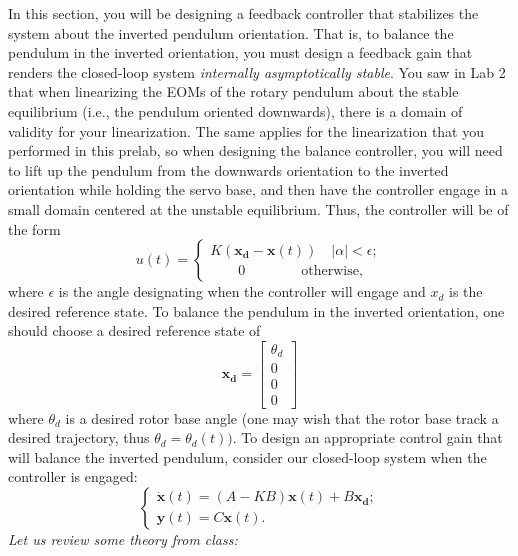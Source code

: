 \documentclass[12pt]{report}
\begin{document}
In this section, you will be designing a feedback controller that stabilizes the system about the inverted pendulum orientation. That is, to balance the pendulum in the inverted orientation, you must design a feedback gain that renders the closed-loop system \emph{internally asymptotically stable}. You saw in Lab 2 that when linearizing the EOMs of the rotary pendulum about the stable equilibrium (i.e., the pendulum oriented downwards), there is a domain of validity for your linearization. The same applies for the linearization that you performed in this prelab, so when designing the balance controller, you will need to lift up the pendulum from the downwards orientation to the inverted orientation while holding the servo base, and then have the controller engage in a small domain centered at the unstable equilibrium. Thus, the controller will be of the form
\[ u(t) =
    \begin{cases}
        K(\mathbf{x_d} - \mathbf{x}(t)) \quad |\alpha| < \epsilon; \\
        \quad \quad 0 \quad \quad \quad \quad \text{otherwise},
    \end{cases}
\]
where $\epsilon$ is the angle designating when the controller will engage and $x_d$ is the desired reference state. To balance the pendulum in the inverted orientation, one should choose a desired reference state of
\[
    \mathbf{x_d} =
    \left[\begin{array}{c}
            \theta_d \\
            0        \\
            0        \\
            0
        \end{array}\right]
\]
where $\theta_d$ is a desired rotor base angle (one may wish that the rotor base track a desired trajectory, thus $\theta_d=\theta_d(t))$. To design an appropriate control gain that will balance the inverted pendulum, consider our closed-loop system when the controller is engaged:
\begin{equation}
    \begin{cases}
        \mathbf{\dot{x}}(t) = \left(A-KB\right)\mathbf{x}(t) + B\mathbf{x_d}; \\
        \mathbf{y}(t) = C\mathbf{x}(t).
    \end{cases}
    \label{equation:lab3_feedback}
\end{equation}
\emph{Let us review some theory from class:}
\end{document}

